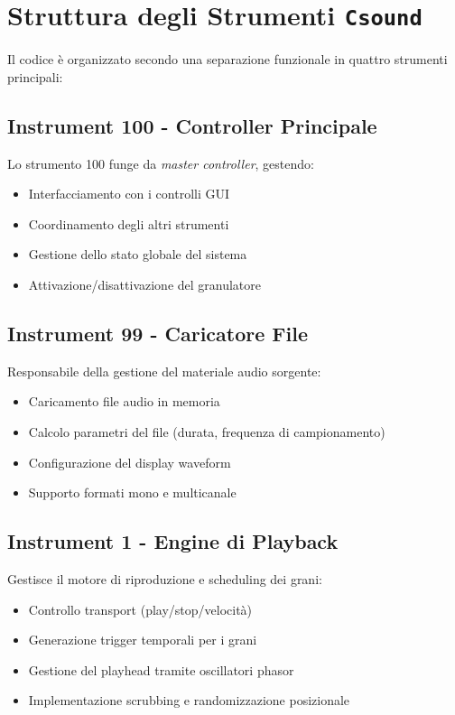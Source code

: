 \documentclass[a4paper,11pt,openany]{book}
\newcommand{\csound}{\texttt{Csound}}
\begin{document}
\section{Struttura degli Strumenti \csound}

Il codice è organizzato secondo una separazione funzionale in quattro strumenti principali:

\subsection{Instrument 100 - Controller Principale}

Lo strumento 100 funge da \textit{master controller}, gestendo:

\begin{itemize}
    \item Interfacciamento con i controlli GUI
    \item Coordinamento degli altri strumenti
    \item Gestione dello stato globale del sistema
    \item Attivazione/disattivazione del granulatore
\end{itemize}

\subsection{Instrument 99 - Caricatore File}

Responsabile della gestione del materiale audio sorgente:

\begin{itemize}
    \item Caricamento file audio in memoria
    \item Calcolo parametri del file (durata, frequenza di campionamento)
    \item Configurazione del display waveform
    \item Supporto formati mono e multicanale
\end{itemize}

\subsection{Instrument 1 - Engine di Playback}

Gestisce il motore di riproduzione e scheduling dei grani:

\begin{itemize}
    \item Controllo transport (play/stop/velocità)
    \item Generazione trigger temporali per i grani
    \item Gestione del playhead tramite oscillatori phasor
    \item Implementazione scrubbing e randomizzazione posizionale
\end{itemize}
\end{document}
